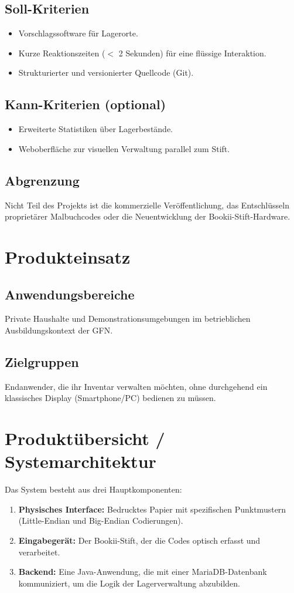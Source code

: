 \documentclass[12pt, a4paper]{article}
\begin{document}
\subsection{Soll-Kriterien}
\begin{itemize}
    \item Vorschlagssoftware für Lagerorte.
    \item Kurze Reaktionszeiten ($<$ 2 Sekunden) für eine flüssige Interaktion.
    \item Strukturierter und versionierter Quellcode (Git).
\end{itemize}

\subsection{Kann-Kriterien (optional)}
\begin{itemize}
    \item Erweiterte Statistiken über Lagerbestände.
    \item Weboberfläche zur visuellen Verwaltung parallel zum Stift.
\end{itemize}

\subsection{Abgrenzung}
Nicht Teil des Projekts ist die kommerzielle Veröffentlichung, das Entschlüsseln proprietärer Malbuchcodes oder die Neuentwicklung der Bookii-Stift-Hardware.

\section{Produkteinsatz}
\subsection{Anwendungsbereiche}
Private Haushalte und Demonstrationsumgebungen im betrieblichen Ausbildungskontext der GFN.
\subsection{Zielgruppen}
Endanwender, die ihr Inventar verwalten möchten, ohne durchgehend ein klassisches Display (Smartphone/PC) bedienen zu müssen.

\section{Produktübersicht / Systemarchitektur}
Das System besteht aus drei Hauptkomponenten:
\begin{enumerate}
    \item \textbf{Physisches Interface:} Bedrucktes Papier mit spezifischen Punktmustern (Little-Endian und Big-Endian Codierungen).
    \item \textbf{Eingabegerät:} Der Bookii-Stift, der die Codes optisch erfasst und verarbeitet.
    \item \textbf{Backend:} Eine Java-Anwendung, die mit einer MariaDB-Datenbank kommuniziert, um die Logik der Lagerverwaltung abzubilden.
\end{enumerate}
\end{document}
